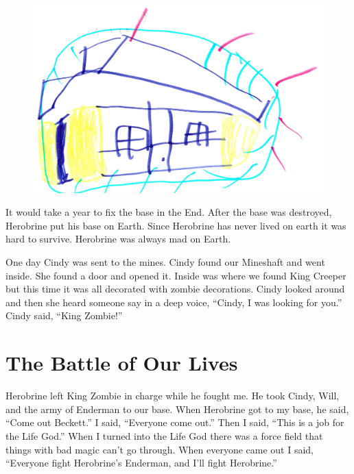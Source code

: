 \documentclass[12pt,oneside]{krantz}
\begin{document}
\begin{figure}
\centering
\includegraphics[width=6.25000in]{img/10-base.jpg}
\caption{}
\end{figure}

It would take a year to fix the base in the End. After the base was
destroyed, Herobrine put his base on Earth. Since Herobrine has never
lived on earth it was hard to survive. Herobrine was always mad on
Earth.

One day Cindy was sent to the mines. Cindy found our Mineshaft and went
inside. She found a door and opened it. Inside was where we found King
Creeper but this time it was all decorated with zombie decorations.
Cindy looked around and then she heard someone say in a deep voice,
``Cindy, I was looking for you.'' Cindy said, ``King Zombie!''

\chapter{The Battle of Our Lives}\label{the-battle-of-our-lives}

Herobrine left King Zombie in charge while he fought me. He took Cindy,
Will, and the army of Enderman to our base. When Herobrine got to my
base, he said, ``Come out Beckett.'' I said, ``Everyone come out.'' Then
I said, ``This is a job for the Life God.'' When I turned into the Life
God there was a force field that things with bad magic can't go through.
When everyone came out I said, ``Everyone fight Herobrine's Enderman,
and I'll fight Herobrine.''
\end{document}
